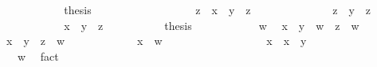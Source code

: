 \begin{isabellebody}
\isanewline
\ \ \ \ \ \ \ \ \isamarkupfalse%
\ \isamarkupfalse%
\ {\isacharquery}thesis\ \isacommand{{\isachardot}}\isamarkupfalse%
\isanewline
\ \ \ \ \ \ \isamarkupfalse%
\isanewline
\ \ \ \ \isamarkupfalse%
\isanewline
\ \ \ \ \isamarkupfalse%
\ {\isachardoublequoteopen}z\ {\isasymsqsubseteq}\ x\ {\isasymsqunion}\ {\isacharparenleft}y\ {\isasymsqunion}\ z{\isacharparenright}{\isachardoublequoteclose}\isanewline
\ \ \ \ \isamarkupfalse%
\ {\isacharminus}\isanewline
\ \ \ \ \ \ \isamarkupfalse%
\ {\isachardoublequoteopen}z\ {\isasymsqsubseteq}\ y\ {\isasymsqunion}\ z{\isachardoublequoteclose}\ \ \isacommand{{\isachardot}{\isachardot}}\isamarkupfalse%
\isanewline
\ \ \ \ \ \ \isamarkupfalse%
\ \isamarkupfalse%
\ {\isachardoublequoteopen}{\isachardot}{\isachardot}{\isachardot}\ {\isasymsqsubseteq}\ x\ {\isasymsqunion}\ {\isacharparenleft}y\ {\isasymsqunion}\ z{\isacharparenright}{\isachardoublequoteclose}\ \isacommand{{\isachardot}{\isachardot}}\isamarkupfalse%
\isanewline
\ \ \ \ \ \ \isamarkupfalse%
\ \isamarkupfalse%
\ {\isacharquery}thesis\ \isacommand{{\isachardot}}\isamarkupfalse%
\isanewline
\ \ \ \ \isamarkupfalse%
\isanewline
\ \ \ \ \isamarkupfalse%
\ w\ \isamarkupfalse%
\ {\isachardoublequoteopen}x\ {\isasymsqunion}\ y\ {\isasymsqsubseteq}\ w{\isachardoublequoteclose}\ \ {\isachardoublequoteopen}z\ {\isasymsqsubseteq}\ w{\isachardoublequoteclose}\isanewline
\ \ \ \ \isamarkupfalse%
\ {\isachardoublequoteopen}x\ {\isasymsqunion}\ {\isacharparenleft}y\ {\isasymsqunion}\ z{\isacharparenright}\ {\isasymsqsubseteq}\ w{\isachardoublequoteclose}\isanewline
\ \ \ \ \isamarkupfalse%
\isanewline
\ \ \ \ \ \ \isamarkupfalse%
\ {\isachardoublequoteopen}x\ {\isasymsqsubseteq}\ w{\isachardoublequoteclose}\isanewline
\ \ \ \ \ \ \isamarkupfalse%
\ {\isacharminus}\isanewline
\ \ \ \ \ \ \ \ \isamarkupfalse%
\ {\isachardoublequoteopen}x\ {\isasymsqsubseteq}\ x\ {\isasymsqunion}\ y{\isachardoublequoteclose}\ \isacommand{{\isachardot}{\isachardot}}\isamarkupfalse%
\isanewline
\ \ \ \ \ \ \ \ \isamarkupfalse%
\ \isamarkupfalse%
\ {\isachardoublequoteopen}{\isasymdots}\ {\isasymsqsubseteq}\ w{\isachardoublequoteclose}\ \isamarkupfalse%
\ fact\isanewline
\ \ \ \ \ \ \ \ \isamarkupfalse%

\end{isabellebody}
